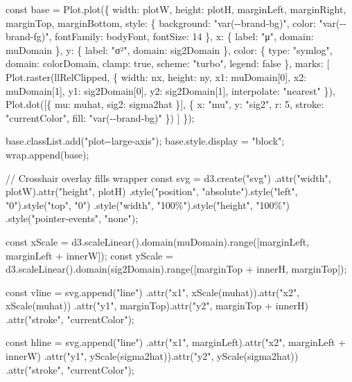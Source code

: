 \documentclass[
  letterpaper,
  DIV=11,
  numbers=noendperiod]{scrreprt}
\newenvironment{Shaded}{\begin{snugshade}}{\end{snugshade}}
\newcommand{\NormalTok}[1]{\textcolor[rgb]{0.00,0.23,0.31}{#1}}
\theoremstyle{definition}
\theoremstyle{plain}
\theoremstyle{definition}
\theoremstyle{remark}
\begin{document}
\begin{Shaded}
\begin{Highlighting}[]
\NormalTok{  const base = Plot.plot(\{}
\NormalTok{    width: plotW, height: plotH,}
\NormalTok{    marginLeft, marginRight, marginTop, marginBottom,}
\NormalTok{    style: \{}
\NormalTok{      background: "var({-}{-}brand{-}bg)",}
\NormalTok{      color: "var({-}{-}brand{-}fg)",}
\NormalTok{      fontFamily: bodyFont, }
\NormalTok{      fontSize: 14}
\NormalTok{    \},}
\NormalTok{    x: \{ label: "μ", domain: muDomain \},}
\NormalTok{    y: \{ label: "σ²", domain: sig2Domain \},}
\NormalTok{    color: \{}
\NormalTok{      type: "symlog",}
\NormalTok{      domain: colorDomain,}
\NormalTok{      clamp: true,}
\NormalTok{      scheme: "turbo",}
\NormalTok{      legend: false}
\NormalTok{    \},}
\NormalTok{    marks: [}
\NormalTok{      Plot.raster(llRelClipped, \{}
\NormalTok{        width: nx, height: ny,}
\NormalTok{        x1: muDomain[0], x2: muDomain[1],}
\NormalTok{        y1: sig2Domain[0], y2: sig2Domain[1],}
\NormalTok{        interpolate: "nearest"}
\NormalTok{      \}),}
\NormalTok{      Plot.dot([\{ mu: muhat, sig2: sigma2hat \}], \{}
\NormalTok{        x: "mu", y: "sig2", r: 5, stroke: "currentColor", fill: "var({-}{-}brand{-}bg)"}
\NormalTok{      \})}
\NormalTok{    ]}
\NormalTok{  \});}

\NormalTok{  base.classList.add("plot{-}{-}large{-}axis");}
\NormalTok{  base.style.display = "block";}
\NormalTok{  wrap.append(base);}


\NormalTok{  // Crosshair overlay fills wrapper}
\NormalTok{  const svg = d3.create("svg")}
\NormalTok{    .attr("width", plotW).attr("height", plotH)}
\NormalTok{    .style("position", "absolute").style("left", "0").style("top", "0")}
\NormalTok{    .style("width", "100\%").style("height", "100\%")}
\NormalTok{    .style("pointer{-}events", "none");}



\NormalTok{  const xScale = d3.scaleLinear().domain(muDomain).range([marginLeft, marginLeft + innerW]);}
\NormalTok{  const yScale = d3.scaleLinear().domain(sig2Domain).range([marginTop + innerH, marginTop]);}

\NormalTok{  const vline = svg.append("line")}
\NormalTok{  .attr("x1", xScale(muhat)).attr("x2", xScale(muhat))}
\NormalTok{  .attr("y1", marginTop).attr("y2", marginTop + innerH)}
\NormalTok{  .attr("stroke", "currentColor");}

\NormalTok{  const hline = svg.append("line")}
\NormalTok{  .attr("x1", marginLeft).attr("x2", marginLeft + innerW)}
\NormalTok{  .attr("y1", yScale(sigma2hat)).attr("y2", yScale(sigma2hat))}
\NormalTok{  .attr("stroke", "currentColor");}


\end{Highlighting}
\end{Shaded}
\end{document}
